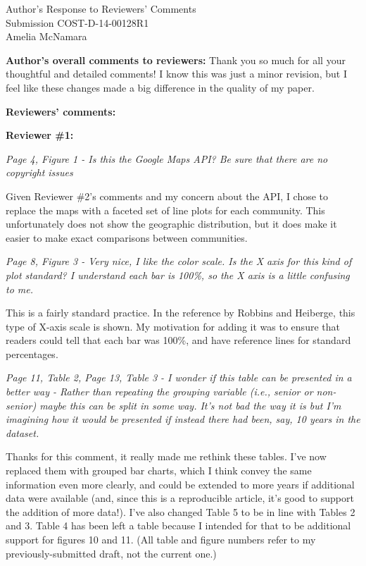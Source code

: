 \documentclass[12pt]{article}
\begin{document}
{\centering
Author's Response to Reviewers' Comments \\ Submission COST-D-14-00128R1 \\ Amelia McNamara

}

\textbf{Author's overall comments to reviewers:} Thank you so much for all your thoughtful and detailed comments! I know this was just a minor revision, but I feel like these changes made a big difference in the quality of my paper. 


\textbf{Reviewers' comments:}

\textbf{Reviewer \#1:}

\emph{Page 4, Figure 1 - Is this the Google Maps API? Be sure that there are no copyright issues} 

Given Reviewer \#2's comments and my concern about the API, I chose to replace the maps with a faceted set of line plots for each community. This unfortunately does not show the geographic distribution, but it does make it easier to make exact comparisons between communities. 

\emph{Page 8, Figure 3 - Very nice, I like the color scale. Is the X axis for this kind of plot standard? I understand each bar is 100\%, so the X axis is a little confusing to me.} 

This is a fairly standard practice. In the reference by Robbins and Heiberge, this type of X-axis scale is shown. My motivation for adding it was to ensure that readers could tell that each bar was 100\%, and have reference lines for standard percentages. 

\emph{Page 11, Table 2, Page 13, Table 3 - I wonder if this table can be presented in a better way - Rather than repeating the grouping variable (i.e., senior or non-senior) maybe this can be split in some way. It's not bad the way it is but I'm imagining how it would be presented if instead there had been, say, 10 years in the dataset.} 

Thanks for this comment, it really made me rethink these tables. I've now replaced them with grouped bar charts, which I think convey the same information even more clearly, and could be extended to more years if additional data were available (and, since this is a reproducible article, it's good to support the addition of more data!). I've also changed Table 5 to be in line with Tables 2 and 3. Table 4 has been left a table because I intended for that to be additional support for figures 10 and 11. (All table and figure numbers refer to my previously-submitted draft, not the current one.)
\end{document}
